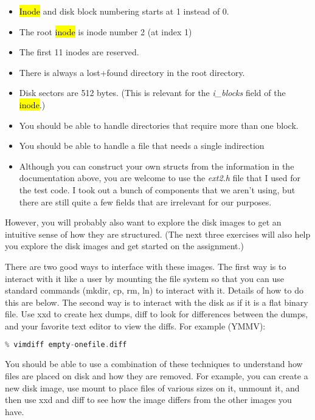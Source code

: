 \documentclass[12pt]{article}
\begin{document}
\begin{itemize}
    \item \hl{Inode} and disk block numbering starts at 1 instead of 0.
    \item The root \hl{inode} is inode number 2 (at index 1)
    \item The first 11 inodes are reserved.
    \item There is always a lost+found directory in the root directory.
    \item Disk sectors are 512 bytes. (This is relevant for the \textit{i\_blocks}
    field of the \hl{inode}.)
    \item You should be able to handle directories that require more than one block.
    \item You should be able to handle a file that needs a single indirection
    \item Although you can construct your own structs from the information in the
    documentation above, you are welcome to use the \textit{ext2.h} file that I used for
    the test code. I took out a bunch of components that we aren't using, but
    there are still quite a few fields that are irrelevant for our purposes.
\end{itemize}

\bigskip

However, you will probably also want to explore the disk images to get an intuitive
sense of how they are structured. (The next three exercises will also help you
explore the disk images and get started on the assignment.)

\bigskip

There are two good ways to interface with these images. The first way is to interact
with it like a user by mounting the file system so that you can use standard
commands (mkdir, cp, rm, ln) to interact with it. Details of how to do this are
below. The second way is to interact with the disk as if it is a flat binary file.
Use xxd to create hex dumps, diff to look for differences between the dumps, and
your favorite text editor to view the diffs. For example (YMMV):

\bigskip

\begin{lstlisting}[language=C]
% diff <(xxd emptydisk.img) <(xxd onefile.img) > empty-onefile.diff
% vimdiff empty-onefile.diff
\end{lstlisting}

You should be able to use a combination of these techniques to understand how
files are placed on disk and how they are removed. For example, you can create
a new disk image, use mount to place files of various sizes on it, unmount it,
and then use xxd and diff to see how the image differs from the other images
you have.
\end{document}
